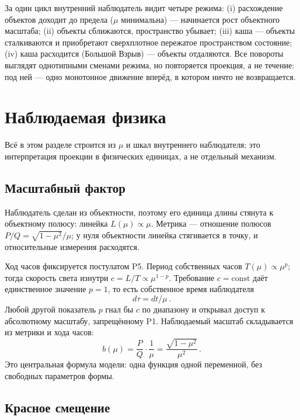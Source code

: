 \documentclass{article}
\begin{document}
За один цикл внутренний наблюдатель видит четыре режима: (i) расхождение объектов доходит до предела ($\mu$ минимальна) --- начинается рост объектного масштаба; (ii) объекты сближаются, пространство убывает; (iii) каша --- объекты сталкиваются и приобретают сверхплотное пережатое пространством состояние; (iv) каша расходится (Большой Взрыв) --- объекты отдаляются. Все повороты выглядят однотипными сменами режима, но повторяется проекция, а не течение: под ней --- одно монотонное движение вперёд, в котором ничто не возвращается.
\section{Наблюдаемая физика}

Всё в этом разделе строится из $\mu$ и шкал внутреннего наблюдателя; это интерпретация проекции в физических единицах, а не отдельный механизм.

\subsection{Масштабный фактор}

Наблюдатель сделан из объектности, поэтому его единица длины стянута к объектному полюсу: линейка $L(\mu) \propto \mu$. Метрика --- отношение полюсов $P/Q = \sqrt{1 - \mu^2}/\mu$; у нуля объектности линейка стягивается в точку, и относительные измерения расходятся.

Ход часов фиксируется постулатом P5. Период собственных часов $T(\mu) \propto \mu^p$; тогда скорость света изнутри $c = L/T \propto \mu^{1-p}$. Требование $c = \text{const}$ даёт единственное значение $p = 1$, то есть собственное время наблюдателя
\begin{equation}
d\tau = dt / \mu\,.
\end{equation}
Любой другой показатель $p$ гнал бы $c$ по диапазону и открывал доступ к абсолютному масштабу, запрещённому P1. Наблюдаемый масштаб складывается из метрики и хода часов:
\begin{equation}
b(\mu) = \frac{P}{Q}\cdot\frac{1}{\mu} = \frac{\sqrt{1 - \mu^2}}{\mu^2}\,.
\end{equation}
Это центральная формула модели: одна функция одной переменной, без свободных параметров формы.

\subsection{Красное смещение}
\end{document}
